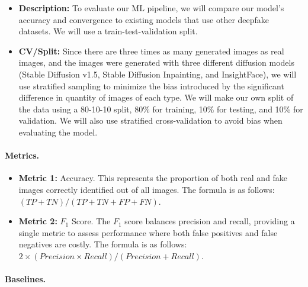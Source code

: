 \documentclass[10pt]{article}
\begin{document}
\begin{itemize}

\item {\bf Description: } To evaluate our ML pipeline, we will compare our model's accuracy and convergence to existing models that use other deepfake datasets. We will use a train-test-validation split. %

\item {\bf CV/Split: } Since there are three times as many generated images as real images, and the images were generated with three different diffusion models (Stable Diffusion v1.5, Stable Diffusion Inpainting, and InsightFace), we will use stratified sampling to minimize the bias introduced by the significant difference in quantity of images of each type. We will make our own split of the data using a 80-10-10 split, 80\% for training, 10\% for testing, and 10\% for validation. We will also use stratified cross-validation to avoid bias when evaluating the model. %

\end{itemize}


\paragraph{Metrics.} 

\begin{itemize}

\item {\bf Metric 1: } Accuracy. This represents the proportion of both real and fake images correctly identified out of all images. The formula is as follows: $(TP+TN)/(TP+TN+FP+FN)$.

\item {\bf Metric 2: } $F_{1}$ Score. The $F_{1}$ score balances precision and recall, providing a single metric to assess performance where both false positives and false negatives are costly. The formula is as follows: $2 \times (Precision \times Recall)/(Precision+Recall)$.

\end{itemize}



\paragraph{Baselines.} 
\end{document}
